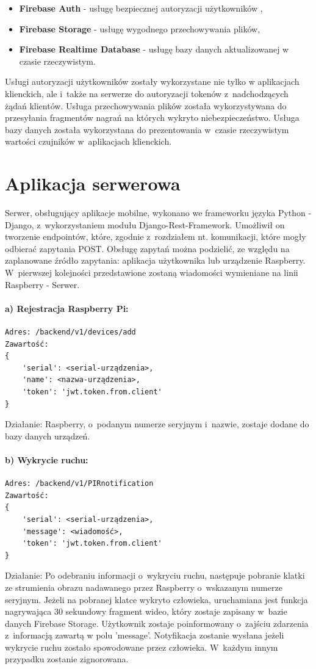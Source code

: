 \begin{itemize}
    \item \textbf{Firebase Auth} - usługę bezpiecznej autoryzacji użytkowników ,
    \item \textbf{Firebase Storage} - usługę wygodnego przechowywania plików,
    \item \textbf{Firebase Realtime Database} - usługę bazy danych aktualizowanej w czasie rzeczywistym.
\end{itemize}

Usługi autoryzacji użytkowników zostały wykorzystane nie tylko w aplikacjach klienckich, ale i~także na serwerze do autoryzacji tokenów z~nadchodzących żądań klientów. Usługa przechowywania plików została wykorzystywana do przesyłania fragmentów nagrań na których wykryto niebezpieczeństwo. Usługa bazy danych została wykorzystana do prezentowania w~czasie rzeczywistym wartości czujników w~aplikacjach klienckich.


\section{Aplikacja serwerowa}

Serwer, obsługujący aplikacje mobilne, wykonano we frameworku języka Python - Django, z~wykorzystaniem modułu Django-Rest-Framework. Umożliwił on tworzenie endpointów, które, zgodnie z~rozdziałem nt. komunikacji, które mogły odbierać zapytania POST.
Obsługę zapytań można podzielić, ze względu na zaplanowane źródło zapytania: aplikacja użytkownika lub urządzenie Raspberry.
W~pierwszej kolejności przedstawione zostaną wiadomości wymieniane na linii Raspberry - Serwer.
\paragraph{a) Rejestracja Raspberry Pi:}
\begin{verbatim}
Adres: /backend/v1/devices/add
Zawartość:
{
	'serial': <serial-urządzenia>, 
	'name': <nazwa-urządzenia>, 
	'token': 'jwt.token.from.client'
}
\end{verbatim}
Działanie: Raspberry, o~podanym numerze seryjnym i~nazwie, zostaje dodane do bazy danych urządzeń.

\paragraph{b) Wykrycie ruchu:}
\begin{verbatim}
Adres: /backend/v1/PIRnotification
Zawartość: 
{
	'serial': <serial-urządzenia>, 
	'message': <wiadomość>, 
	'token': 'jwt.token.from.client'
}
\end{verbatim}
Działanie: Po odebraniu informacji o~wykryciu ruchu, następuje pobranie klatki ze strumienia obrazu nadawanego przez Raspberry o~wskazanym numerze seryjnym. Jeżeli na pobranej klatce wykryto człowieka, uruchamiana jest funkcja nagrywająca 30 sekundowy fragment wideo, który zostaje zapisany w~bazie danych Firebase Storage. Użytkownik zostaje poinformowany o~zajściu zdarzenia z~informacją zawartą w polu 'message'. Notyfikacja zostanie wysłana jeżeli wykrycie ruchu zostało spowodowane przez człowieka. W~każdym innym przypadku zostanie zignorowana.

